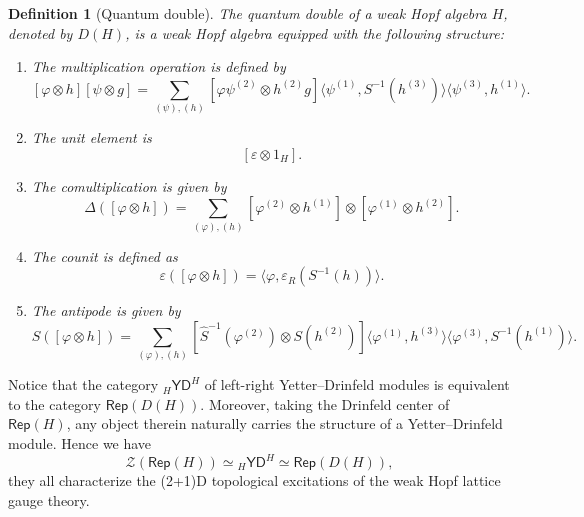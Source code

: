 \documentclass[a4paper,11pt]{article}
\theoremstyle{theorem}
\newtheorem{definition}{Definition}
\theoremstyle{remark}
\newcommand{\Rep}{\mathsf{Rep}}
\begin{document}
\begin{definition}[Quantum double] \label{def:quantum-double}
The quantum double of a weak Hopf algebra \(H\), denoted by \(D(H)\), is a weak Hopf algebra equipped with the following structure:

\begin{enumerate}
    \item[(1)] The multiplication operation is defined by
    \[
    [\varphi \otimes h] [\psi \otimes g] = \sum_{(\psi), (h)} [\varphi \psi^{(2)} \otimes h^{(2)} g] \langle \psi^{(1)}, S^{-1}(h^{(3)}) \rangle \langle \psi^{(3)}, h^{(1)} \rangle.
    \]
    
    \item[(2)] The unit element is
    \[
    [\varepsilon \otimes 1_H].
    \]
    
    \item[(3)] The comultiplication is given by
    \[
    \Delta([\varphi \otimes h]) = \sum_{(\varphi), (h)} [\varphi^{(2)} \otimes h^{(1)}] \otimes [\varphi^{(1)} \otimes h^{(2)}].
    \]
    
    \item[(4)] The counit is defined as
    \[
    \varepsilon ([\varphi \otimes h]) = \langle \varphi, \varepsilon_R(S^{-1}(h)) \rangle.
    \]
    
    \item[(5)] The antipode is given by
    \[
    S([\varphi \otimes h]) = \sum_{(\varphi), (h)} [\hat{S}^{-1}(\varphi^{(2)}) \otimes S(h^{(2)})] \langle \varphi^{(1)}, h^{(3)} \rangle \langle \varphi^{(3)}, S^{-1}(h^{(1)}) \rangle.
    \]
\end{enumerate}
\end{definition}

Notice that the category ${}_{H}\mathsf{YD}^H$ of left-right Yetter--Drinfeld modules is equivalent to the category $\Rep(D(H))$. Moreover, taking the Drinfeld center of $\Rep(H)$, any object therein naturally carries the structure of a Yetter--Drinfeld module. Hence we have 
\[
\mathcal{Z}(\Rep(H))  \simeq {}_{H}\mathsf{YD}^H \simeq \Rep(D(H)),
\]
they all characterize the (2+1)D topological excitations of the weak Hopf lattice gauge theory.
\end{document}

